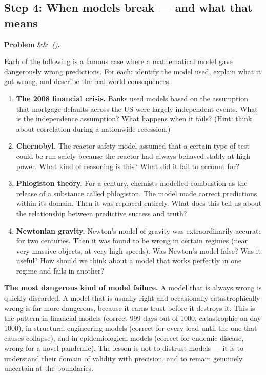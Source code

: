\documentclass[12pt, a4paper]{article}
\newcounter{problem}
\newenvironment{problem}[1][]{%
  \refstepcounter{problem}%
  \par\vspace{6pt}%
  \noindent\textbf{\color{MidBlue}Problem \theproblem}%
  \ifx&#1&\else\ \textit{(#1)}\fi\textbf{.}\enskip
}{\par\vspace{4pt}}
\begin{document}
\subsection{Step 4: When models break --- and what that means}

\begin{problem}
\label{prob:model_failure}
Each of the following is a famous case where a mathematical model gave dangerously wrong predictions. For each: identify the model used, explain what it got wrong, and describe the real-world consequences.

\begin{enumerate}[label=(\alph*), topsep=2pt]
  \item \textbf{The 2008 financial crisis.} Banks used models based on the assumption that mortgage defaults across the US were largely independent events. What is the independence assumption? What happens when it fails? (Hint: think about correlation during a nationwide recession.)

  \item \textbf{Chernobyl.} The reactor safety model assumed that a certain type of test could be run safely because the reactor had always behaved stably at high power. What kind of reasoning is this? What did it fail to account for?

  \item \textbf{Phlogiston theory.} For a century, chemists modelled combustion as the release of a substance called phlogiston. The model made correct predictions within its domain. Then it was replaced entirely. What does this tell us about the relationship between predictive success and truth?

  \item \textbf{Newtonian gravity.} Newton's model of gravity was extraordinarily accurate for two centuries. Then it was found to be wrong in certain regimes (near very massive objects, at very high speeds). Was Newton's model false? Was it useful? How should we think about a model that works perfectly in one regime and fails in another?
\end{enumerate}
\end{problem}

\begin{warning}
\textbf{The most dangerous kind of model failure.}
A model that is always wrong is quickly discarded. A model that is usually right and occasionally catastrophically wrong is far more dangerous, because it earns trust before it destroys it. This is the pattern in financial models (correct 999 days out of 1000, catastrophic on day 1000), in structural engineering models (correct for every load until the one that causes collapse), and in epidemiological models (correct for endemic disease, wrong for a novel pandemic). The lesson is not to distrust models --- it is to understand their domain of validity with precision, and to remain genuinely uncertain at the boundaries.
\end{warning}
\end{document}
